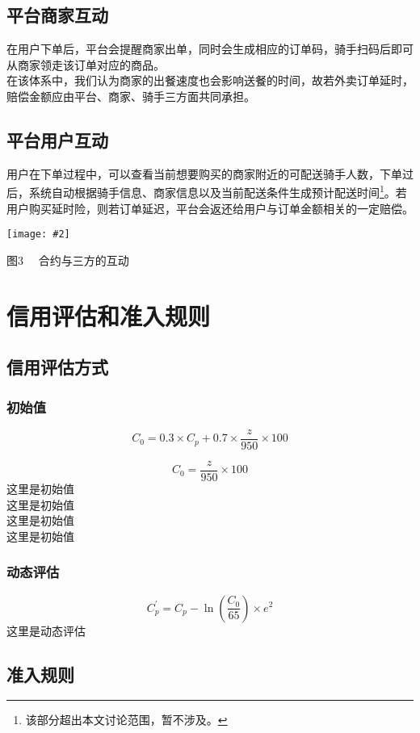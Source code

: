 \documentclass[UTF8]{ctexart}
\newcommand\picturehere[2][1]{\centerline{\texttt{[image: \#2]}}}
\newcommand\picfig[1]{\centerline{\small \heiti #1 \songti }}
\begin{document}
\begin{multicols}{2}
  \subsection{平台商家互动}
  \indent 在用户下单后，平台会提醒商家出单，同时会生成相应的订单码，骑手扫码后即可从商家领走该订单对应的商品。\\
  \indent 在该体系中，我们认为商家的出餐速度也会影响送餐的时间，故若外卖订单延时，赔偿金额应由平台、商家、骑手三方面共同承担。
  \subsection{平台用户互动}
  \indent 用户在下单过程中，可以查看当前想要购买的商家附近的可配送骑手人数，下单过后，系统自动根据骑手信息、商家信息以及当前配送条件生成预计配送时间\footnote{该部分超出本文讨论范围，暂不涉及。}。若用户购买延时险，则若订单延迟，平台会返还给用户与订单金额相关的一定赔偿。
  \picturehere[0.5]{image/contract.png}
  \picfig{图3 \ \ 合约与三方的互动}



  \section{信用评估和准入规则}
  \subsection{信用评估方式}
  \subsubsection{初始值}
  $$C_0=0.3\times C_p + 0.7 \times \frac{z}{950} \times 100$$

  $$C_0=\frac{z}{950} \times 100$$
  这里是初始值\\
  这里是初始值\\
  这里是初始值\\
  这里是初始值
  \subsubsection{动态评估}
  $$C_p^\prime=C_p-\ln(\frac{C_0}{65})\times e^2$$
  这里是动态评估
  \subsection{准入规则}

\end{multicols}
\end{document}
